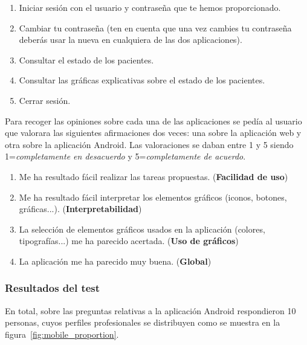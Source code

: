 \begin{enumerate}
	\item Iniciar sesión con el usuario y contraseña que te hemos proporcionado. 
	\item Cambiar tu contraseña (ten en cuenta que una vez cambies tu contraseña deberás usar la nueva en cualquiera de las dos aplicaciones). 
	\item Consultar el estado de los pacientes. 
	\item Consultar las gráficas explicativas sobre el estado de los pacientes. 
	\item Cerrar sesión. 
\end{enumerate}

Para recoger las opiniones sobre cada una de las aplicaciones se pedía al usuario que valorara las siguientes afirmaciones dos veces: una sobre la aplicación web y otra sobre la aplicación Android. Las valoraciones se daban entre 1 y 5 siendo 1=\textit{completamente en desacuerdo} y 5=\textit{completamente de acuerdo}. 

\begin{enumerate}
	\item Me ha resultado fácil realizar las tareas propuestas. (\textbf{Facilidad de uso})
	\item Me ha resultado fácil interpretar los elementos gráficos (iconos, botones, gráficas...). (\textbf{Interpretabilidad})
	\item La selección de elementos gráficos usados en la aplicación (colores, tipografías...) me ha parecido acertada. (\textbf{Uso de gráficos})
	\item La aplicación me ha parecido muy buena. (\textbf{Global})
\end{enumerate}

\subsubsection{Resultados del test}

En total, sobre las preguntas relativas a la aplicación Android respondieron 10 personas, cuyos perfiles profesionales se distribuyen como se muestra en la figura~\ref{fig:mobile_proportion}. 

